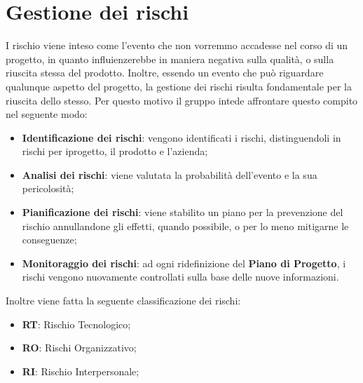 \section{Gestione dei rischi}
I rischio viene inteso come l'evento che non vorremmo accadesse nel corso di un progetto, in quanto influienzerebbe in maniera negativa sulla qualità, o sulla riuscita stessa del prodotto. Inoltre, essendo un evento che può riguardare qualunque aspetto del progetto, la gestione dei rischi risulta fondamentale per la riuscita dello stesso. Per questo motivo il gruppo intede affrontare questo compito nel seguente modo:\\
\begin{itemize}
\item \textbf{Identificazione dei rischi}: vengono identificati i rischi, distinguendoli in rischi per iprogetto, il prodotto e l'azienda;
\item \textbf{Analisi dei rischi}: viene valutata la probabilità dell'evento e la sua pericolosità;
\item \textbf{Pianificazione dei rischi}: viene stabilito un piano per la prevenzione del rischio annullandone gli effetti, quando possibile, o per lo meno mitigarne le conseguenze;
\item \textbf{Monitoraggio dei rischi}: ad ogni ridefinizione del \textbf{Piano di Progetto}, i rischi vengono nuovamente controllati sulla base delle nuove informazioni.
\end{itemize}
Inoltre viene fatta la seguente classificazione dei rischi:
\begin{itemize}
\item \textbf{RT}: Rischio Tecnologico;
\item \textbf{RO}: Rischi Organizzativo;
\item \textbf{RI}: Rischio Interpersonale;
\end{itemize}
